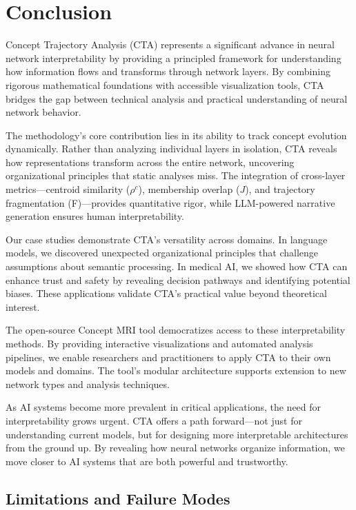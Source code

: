 \section{Conclusion}

Concept Trajectory Analysis (CTA) represents a significant advance in neural network interpretability by providing a principled framework for understanding how information flows and transforms through network layers. By combining rigorous mathematical foundations with accessible visualization tools, CTA bridges the gap between technical analysis and practical understanding of neural network behavior.

The methodology's core contribution lies in its ability to track concept evolution dynamically. Rather than analyzing individual layers in isolation, CTA reveals how representations transform across the entire network, uncovering organizational principles that static analyses miss. The integration of cross-layer metrics—centroid similarity ($\rho^c$), membership overlap ($J$), and trajectory fragmentation (F)—provides quantitative rigor, while LLM-powered narrative generation ensures human interpretability.

Our case studies demonstrate CTA's versatility across domains. In language models, we discovered unexpected organizational principles that challenge assumptions about semantic processing. In medical AI, we showed how CTA can enhance trust and safety by revealing decision pathways and identifying potential biases. These applications validate CTA's practical value beyond theoretical interest.

The open-source Concept MRI tool democratizes access to these interpretability methods. By providing interactive visualizations and automated analysis pipelines, we enable researchers and practitioners to apply CTA to their own models and domains. The tool's modular architecture supports extension to new network types and analysis techniques.

As AI systems become more prevalent in critical applications, the need for interpretability grows urgent. CTA offers a path forward—not just for understanding current models, but for designing more interpretable architectures from the ground up. By revealing how neural networks organize information, we move closer to AI systems that are both powerful and trustworthy.

\subsection{Limitations and Failure Modes}

